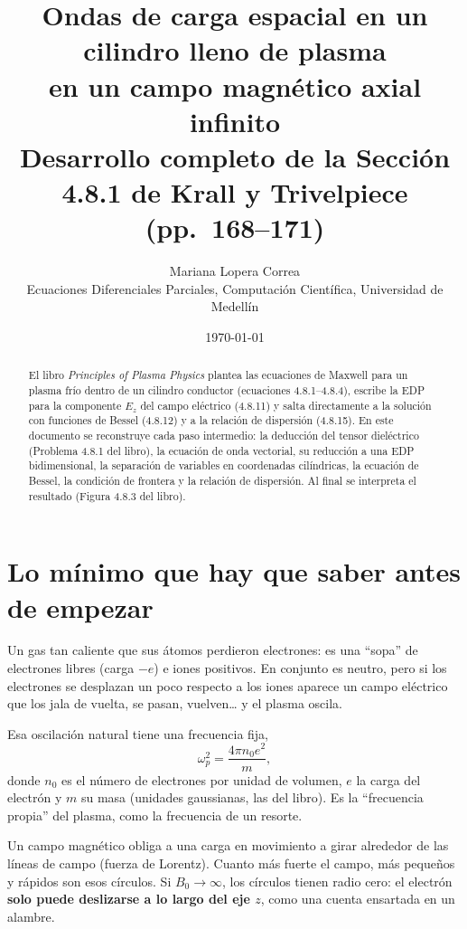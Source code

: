 \documentclass[11pt,a4paper]{article}
\title{\textbf{Ondas de carga espacial en un cilindro lleno de plasma\\ en un campo magnético axial infinito}\\[4pt]
\large Desarrollo completo de la Sección 4.8.1 de Krall y Trivelpiece (pp.~168--171)}
\author{Mariana Lopera Correa\\ \small Ecuaciones Diferenciales Parciales, Computación Científica, Universidad de Medellín}
\date{\today}
\renewcommand{\wp}{\omega_p}
\begin{document}
\maketitle

\begin{abstract}
El libro \emph{Principles of Plasma Physics} plantea las ecuaciones de Maxwell para un plasma frío dentro de un cilindro conductor (ecuaciones 4.8.1--4.8.4), escribe la EDP para la componente $E_z$ del campo eléctrico (4.8.11) y salta directamente a la solución con funciones de Bessel (4.8.12) y a la relación de dispersión (4.8.15). En este documento se reconstruye cada paso intermedio: la deducción del tensor dieléctrico (Problema 4.8.1 del libro), la ecuación de onda vectorial, su reducción a una EDP bidimensional, la separación de variables en coordenadas cilíndricas, la ecuación de Bessel, la condición de frontera y la relación de dispersión. Al final se interpreta el resultado (Figura 4.8.3 del libro).
\end{abstract}

\tableofcontents
\newpage

\section{Lo mínimo que hay que saber antes de empezar}

\begin{idea}
Un gas tan caliente que sus átomos perdieron electrones: es una ``sopa'' de electrones libres (carga $-e$) e iones positivos. En conjunto es neutro, pero si los electrones se desplazan un poco respecto a los iones aparece un campo eléctrico que los jala de vuelta, se pasan, vuelven\ldots{} y el plasma oscila.
\end{idea}

\begin{idea}
Esa oscilación natural tiene una frecuencia fija,
\[
\wp^2=\frac{4\pi n_0 e^2}{m},
\]
donde $n_0$ es el número de electrones por unidad de volumen, $e$ la carga del electrón y $m$ su masa (unidades gaussianas, las del libro). Es la ``frecuencia propia'' del plasma, como la frecuencia de un resorte.
\end{idea}

\begin{idea}
Un campo magnético obliga a una carga en movimiento a girar alrededor de las líneas de campo (fuerza de Lorentz). Cuanto más fuerte el campo, más pequeños y rápidos son esos círculos. Si $B_0\to\infty$, los círculos tienen radio cero: el electrón \textbf{solo puede deslizarse a lo largo del eje $z$}, como una cuenta ensartada en un alambre.
\end{idea}
\end{document}
